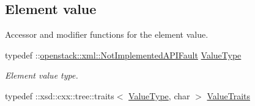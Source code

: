 \subsection*{Element value}
\label{_amgrp2ee2eae1a8c390ea033f241c027da8d6}
Accessor and modifier functions for the element value. \begin{DoxyCompactItemize}
\item 
\hypertarget{classopenstack_1_1xml_1_1NotImplemented_a3ee34633dbdc72c1d821ff3dccd84a22}{
typedef ::\hyperlink{classopenstack_1_1xml_1_1NotImplementedAPIFault}{openstack::xml::NotImplementedAPIFault} \hyperlink{classopenstack_1_1xml_1_1NotImplemented_a3ee34633dbdc72c1d821ff3dccd84a22}{ValueType}}
\label{classopenstack_1_1xml_1_1NotImplemented_a3ee34633dbdc72c1d821ff3dccd84a22}

\begin{DoxyCompactList}\small\item\em Element value type. \item\end{DoxyCompactList}\item 
\hypertarget{classopenstack_1_1xml_1_1NotImplemented_a292c02a1b2ad33c1e12385a47a414f48}{
typedef ::xsd::cxx::tree::traits$<$ \hyperlink{classopenstack_1_1xml_1_1NotImplementedAPIFault}{ValueType}, char $>$ \hyperlink{classopenstack_1_1xml_1_1NotImplemented_a292c02a1b2ad33c1e12385a47a414f48}{ValueTraits}}
\label{classopenstack_1_1xml_1_1NotImplemented_a292c02a1b2ad33c1e12385a47a414f48}


\end{DoxyCompactItemize}
